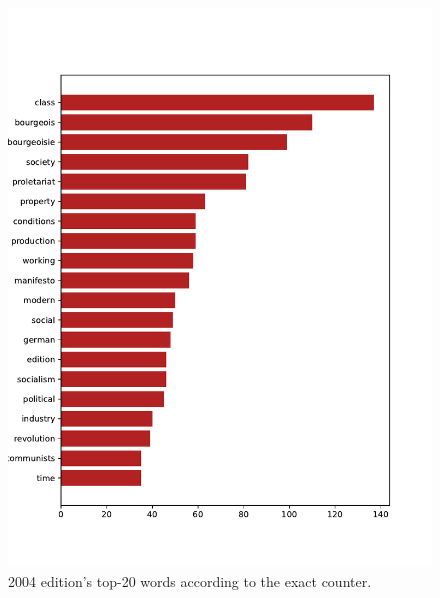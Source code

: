 \begin{figure}[!ht]
    \centering
    \includegraphics[width=0.9\linewidth]{figs/2004.epub-total}
    \caption{2004 edition's top-20 words according to the exact counter.}
    \label{fig:2004-20-exact}
\end{figure}


